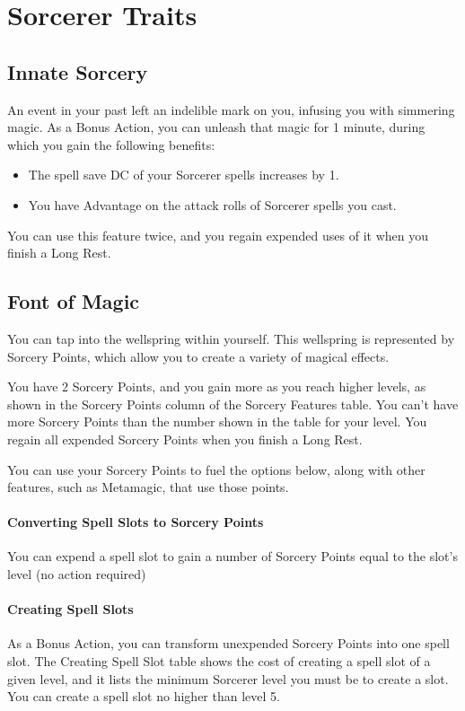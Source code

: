 \documentclass[letterpaper,openany,oneside,twocolumn]{book}
\begin{document}
\section*{Sorcerer Traits}
\subsection*{Innate Sorcery}
An event in your past left an indelible mark on you, infusing you with simmering magic. As a Bonus Action, you can unleash that magic for 1 minute, during which you gain the following benefits:
\begin{itemize}
	\item The spell save DC of your Sorcerer spells increases by 1.
	\item You have Advantage on the attack rolls of Sorcerer spells you cast.
\end{itemize}
You can use this feature twice, and you regain expended uses of it when you finish a Long Rest.
\subsection*{Font of Magic}
You can tap into the wellspring within yourself. This wellspring is represented by Sorcery Points, which allow you to create a variety of magical effects.

You have 2 Sorcery Points, and you gain more as you reach higher levels, as shown in the Sorcery Points column of the Sorcery Features table. You can't have more Sorcery Points than the number shown in the table for your level. You regain all expended Sorcery Points when you finish a Long Rest.

You can use your Sorcery Points to fuel the options below, along with other features, such as Metamagic, that use those points.

\paragraph*{Converting Spell Slots to Sorcery Points} You can expend a spell slot to gain a number of Sorcery Points equal to the slot's level (no action required)

\paragraph*{Creating Spell Slots} As a Bonus Action, you can transform unexpended Sorcery Points into one spell slot. The Creating Spell Slot table shows the cost of creating a spell slot of a given level, and it lists the minimum Sorcerer level you must be to create a slot. You can create a spell slot no higher than level 5.
\end{document}
